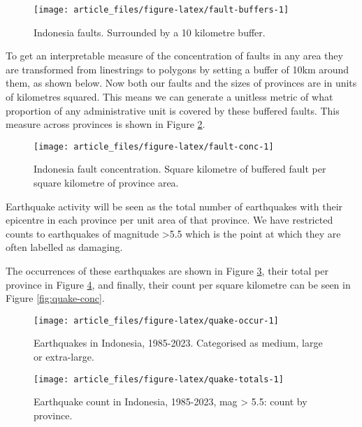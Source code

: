 \begin{figure}

{\centering \texttt{[image: article\_files/figure-latex/fault-buffers-1]} 

}

\caption{Indonesia faults. Surrounded by a 10 kilometre buffer. }\label{fig:fault-buffers}
\end{figure}

To get an interpretable measure of the concentration of faults in any area
they are transformed from linestrings to polygons by setting a buffer of
10km around them, as shown below. Now both our faults and the sizes of provinces are in units of kilometres
squared. This means we can generate a unitless metric of what proportion of any administrative unit
is covered by these buffered faults. This measure across provinces is shown in Figure
\ref{fig:fault-conc}.

\begin{figure}

{\centering \texttt{[image: article\_files/figure-latex/fault-conc-1]} 

}

\caption{Indonesia fault concentration. Square kilometre of buffered fault per square kilometre of province area. }\label{fig:fault-conc}
\end{figure}

Earthquake activity will be seen as the total number of earthquakes with
their epicentre in each province per unit area of that province. We have
restricted counts to earthquakes of magnitude \textgreater5.5 which is the point
at which they are often labelled as damaging.

The occurrences of these earthquakes are shown in Figure \ref{fig:quake-occur}, their total per province in Figure \ref{fig:quake-totals}, and finally, their count per square kilometre can be seen in Figure \ref{fig:quake-conc}.

\begin{figure}

{\centering \texttt{[image: article\_files/figure-latex/quake-occur-1]} 

}

\caption{Earthquakes in Indonesia, 1985-2023. Categorised as medium, large or extra-large. }\label{fig:quake-occur}
\end{figure}

\begin{figure}

{\centering \texttt{[image: article\_files/figure-latex/quake-totals-1]} 

}

\caption{Earthquake count in Indonesia, 1985-2023, mag > 5.5: count by province. }\label{fig:quake-totals}
\end{figure}

